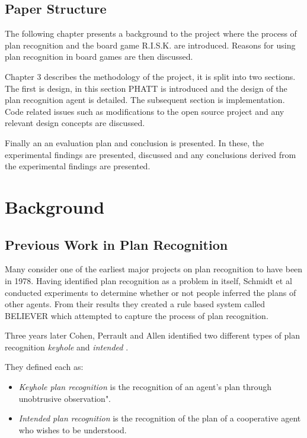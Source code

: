 \documentclass[parskip]{cs4rep}
\begin{document}
\section{Paper Structure}

The following chapter presents a background to the project where the process of plan recognition and the board game R.I.S.K. are introduced. Reasons for using plan recognition in board games are then discussed.

Chapter 3 describes the methodology of the project, it is split into two sections. The first is design, in this section PHATT is introduced and the design of the plan recognition agent is detailed. The subsequent section is implementation. Code related issues such as modifications to the open source project and any relevant design concepts are discussed. 

Finally an an evaluation plan and conclusion is presented. In these, the experimental findings are presented, discussed and any conclusions derived from the experimental findings are presented.

\chapter{Background}

\section{Previous Work in Plan Recognition}

Many consider one of the earliest major projects on plan recognition to have been in 1978. Having identified plan recognition as a problem in itself, Schmidt et al \cite{journals/ai/SchmidtSG78} conducted experiments to determine whether or not people inferred the plans of other agents. From their results they created a rule based system called BELIEVER which attempted to capture the process of plan recognition. 

Three years later Cohen, Perrault and Allen identified two different types of plan recognition \textit{keyhole} and \textit{intended} \cite{Cohen82a}. 

They defined each as:

\begin{itemize}
\item
\textit{Keyhole plan recognition} is the recognition of an agent's plan through unobtrusive observation".
\item
\textit{Intended plan recognition} is the recognition of the plan of a cooperative agent who wishes to be understood.
\end{itemize}
\end{document}
